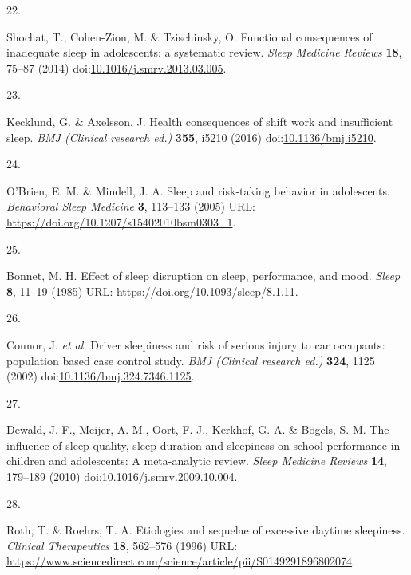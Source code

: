 \documentclass[
  10pt,
]{scrbook}
\newlength{\cslhangindent}
\newlength{\csllabelwidth}
\newlength{\cslentryspacingunit} %
\newenvironment{CSLReferences}[2] %
 {%
  \setlength{\parindent}{0pt}
  \ifodd #1
  \let\oldpar\par
  \def\par{\hangindent=\cslhangindent\oldpar}
  \fi
  \setlength{\parskip}{#2\cslentryspacingunit}
 }%
 {}
\newcommand{\CSLLeftMargin}[1]{\parbox[t]{\csllabelwidth}{#1}}
\newcommand{\CSLRightInline}[1]{\parbox[t]{\linewidth - \csllabelwidth}{#1}\break}
\let\originaltextbf\textbf
\renewcommand{\textbf}[1]{\textcolor{color1}{\textsf{\originaltextbf{#1}}}}
\begin{document}
\begin{CSLReferences}{0}{0}
\leavevmode{}%
\CSLLeftMargin{22. }%
\CSLRightInline{Shochat, T., Cohen-Zion, M. \& Tzischinsky, O.
Functional consequences of inadequate sleep in adolescents: a systematic
review. \emph{Sleep Medicine Reviews} \textbf{18}, 75--87 (2014)
doi:\href{https://doi.org/10.1016/j.smrv.2013.03.005}{10.1016/j.smrv.2013.03.005}.}

\leavevmode{}%
\CSLLeftMargin{23. }%
\CSLRightInline{Kecklund, G. \& Axelsson, J. Health consequences of
shift work and insufficient sleep. \emph{BMJ (Clinical research ed.)}
\textbf{355}, i5210 (2016)
doi:\href{https://doi.org/10.1136/bmj.i5210}{10.1136/bmj.i5210}.}

\leavevmode{}%
\CSLLeftMargin{24. }%
\CSLRightInline{O'Brien, E. M. \& Mindell, J. A. Sleep and risk-taking
behavior in adolescents. \emph{Behavioral Sleep Medicine} \textbf{3},
113--133 (2005) URL: \url{https://doi.org/10.1207/s15402010bsm0303_1}.}

\leavevmode{}%
\CSLLeftMargin{25. }%
\CSLRightInline{Bonnet, M. H. Effect of sleep disruption on sleep,
performance, and mood. \emph{Sleep} \textbf{8}, 11--19 (1985) URL:
\url{https://doi.org/10.1093/sleep/8.1.11}.}

\leavevmode{}%
\CSLLeftMargin{26. }%
\CSLRightInline{Connor, J. \emph{et al.} Driver sleepiness and risk of
serious injury to car occupants: population based case control study.
\emph{BMJ (Clinical research ed.)} \textbf{324}, 1125 (2002)
doi:\href{https://doi.org/10.1136/bmj.324.7346.1125}{10.1136/bmj.324.7346.1125}.}

\leavevmode{}%
\CSLLeftMargin{27. }%
\CSLRightInline{Dewald, J. F., Meijer, A. M., Oort, F. J., Kerkhof, G.
A. \& Bögels, S. M. The influence of sleep quality, sleep duration and
sleepiness on school performance in children and adolescents: A
meta-analytic review. \emph{Sleep Medicine Reviews} \textbf{14},
179--189 (2010)
doi:\href{https://doi.org/10.1016/j.smrv.2009.10.004}{10.1016/j.smrv.2009.10.004}.}

\leavevmode{}%
\CSLLeftMargin{28. }%
\CSLRightInline{Roth, T. \& Roehrs, T. A. Etiologies and sequelae of
excessive daytime sleepiness. \emph{Clinical Therapeutics} \textbf{18},
562--576 (1996) URL:
\url{https://www.sciencedirect.com/science/article/pii/S0149291896802074}.}


\end{CSLReferences}
\end{document}
